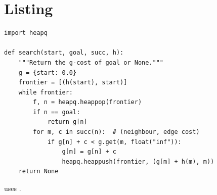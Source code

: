 \section{Listing}
\begin{lstlisting}[caption={A minimal priority-queue search.},label={lst:styletest-search}]
import heapq

def search(start, goal, succ, h):
    """Return the g-cost of goal or None."""
    g = {start: 0.0}
    frontier = [(h(start), start)]
    while frontier:
        f, n = heapq.heappop(frontier)
        if n == goal:
            return g[n]
        for m, c in succ(n):  # (neighbour, edge cost)
            if g[n] + c < g.get(m, float("inf")):
                g[m] = g[n] + c
                heapq.heappush(frontier, (g[m] + h(m), m))
    return None
\end{lstlisting}
 uses .
